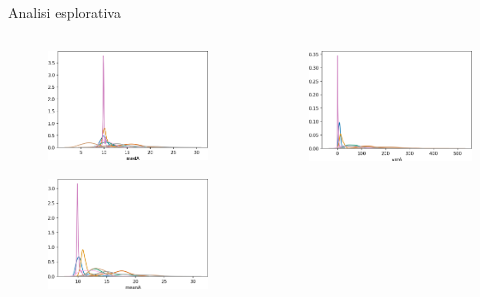 \documentclass{beamer}
\begin{document}
\begin{frame}{Analisi esplorativa}
\begin{columns}[T]
\begin{column}{.33\textwidth}
\begin{figure}[H]
\includegraphics[width=\textwidth]{../figure/medA.png}
\end{figure}
\begin{figure}[H]
\includegraphics[width=\textwidth]{../figure/meanA.png}
\end{figure}
\end{column}%
\hfill%
\begin{column}{.33\textwidth}
\begin{figure}[H]
\includegraphics[width=\textwidth]{../figure/varA.png}

\end{figure}
\end{column}
\end{columns}
\end{frame}
\end{document}
